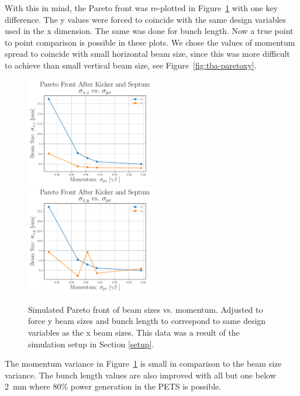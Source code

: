 With this in mind, the Pareto front was re-plotted in Figure~\ref{fig:tba-pareto} 
with one key difference. The y values were forced to coincide with the same 
design variables used in the x dimension. The same was done for bunch length.
Now a true point to point comparison is possible in these plots.
We chose the values of momentum spread to coincide with small horizontal beam size, 
since this was more difficult to achieve than small vertical beam size, see Figure~\ref{fig:tba-paretoxy}. 
\begin{figure}
	\centering
	\includegraphics[width=0.5\textwidth]{./images/xz_vs_px_pareto_front_Q5}%
	\includegraphics[width=0.5\textwidth]{images/xy_vs_px_pareto_front_Q5}
	\caption{Simulated Pareto front of beam sizes vs. momentum.
		Adjusted to force y beam sizes and bunch length to correspond to same design variables 
		as the x beam sizes.
		This data was a result of the simulation setup in Section \ref{setup}.}
	\label{fig:tba-pareto}
\end{figure}
The momentum variance in Figure~\ref{fig:tba-pareto} is small in comparison to 
the beam size variance. The bunch length values are also improved with all but one below \SI{2}{mm}
where 80\% power generation in the PETS is possible. 

